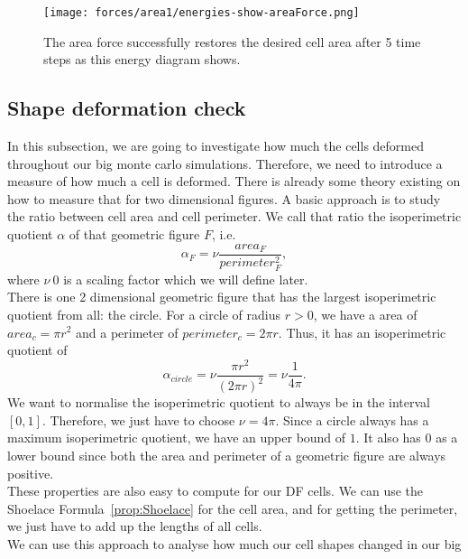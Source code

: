 \begin{figure}[h!]
    \centering
        \texttt{[image: forces/area1/energies-show-areaForce.png]} 
    \caption{The area force successfully restores the desired cell area after 5 time steps as this energy diagram shows.}
	\label{fig:areaEnergyDiagram}    
\end{figure}

\subsection{Shape deformation check}
In this subsection, we are going to investigate how much the cells deformed throughout our big monte carlo simulations.
Therefore, we need to introduce a measure of how much a cell is deformed. 
There is already some theory existing on how to measure that for two dimensional figures. 
A basic approach is to study the ratio between cell area and cell perimeter. 
We call that ratio the isoperimetric quotient $\alpha$ of that geometric figure $F$, i.e. 
\[
    \alpha_{F} = \nu \dfrac{area_{F}}{perimeter_{F}^2},  
\]
where $\nu \> 0 $ is a scaling factor which we will define later. \\
There is one 2 dimensional geometric figure that has the largest isoperimetric quotient from all: the circle. 
For a circle of radius $r>0$, we have a area of $area_c = \pi r^2 $ and a perimeter of $perimeter_c = 2 \pi r $. 
Thus, it has an isoperimetric quotient of 
\[
    \alpha_{circle} = \nu \dfrac{\pi r^2}{(2 \pi r)^2} = \nu \dfrac{1}{4 \pi}.
\]
We want to normalise the isoperimetric quotient to always be in the interval $[0,1]$. 
Therefore, we just have to choose $\nu = 4 \pi$.
Since a circle always has a maximum isoperimetric quotient, we have an upper bound of $1$.
It also has $0$ as a lower bound since both the area and perimeter of a geometric figure are always positive. \\ 
These properties are also easy to compute for our DF cells. 
We can use the Shoelace Formula~\ref{prop:Shoelace} for the cell area, and for getting the perimeter, we just have to add up the lengths of all cells. \\ 

We can use this approach to analyse how much our cell shapes changed in our big 

